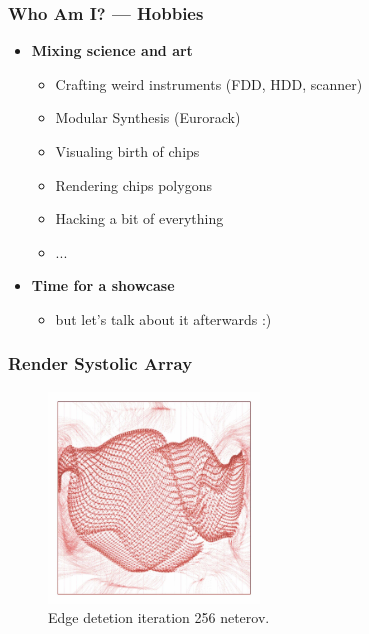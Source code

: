 \begin{frame}
	\frametitle{Who Am I? — Hobbies}
	\begin{itemize}
		\item<1-> \textbf{Mixing science and art}
		\begin{itemize}
			\item Crafting weird instruments (FDD, HDD, scanner)
			\item Modular Synthesis (Eurorack)
			\item Visualing birth of chips
			\item Rendering chips polygons
			\item Hacking a bit of everything
			\item ...
		\end{itemize}
		\item<2-> \textbf{Time for a showcase}
		\begin{itemize}
			\item but let's talk about it afterwards :)
		\end{itemize}
	\end{itemize}
\end{frame}

\begin{frame}
	\frametitle{Render Systolic Array}
	\begin{figure}[H]
		\centering
		\includegraphics[width=0.5\textwidth]{4096PE.jpg}
		\caption{Edge detetion iteration 256 neterov.}
		\label{fig:4096PE}
	\end{figure}
\end{frame}

